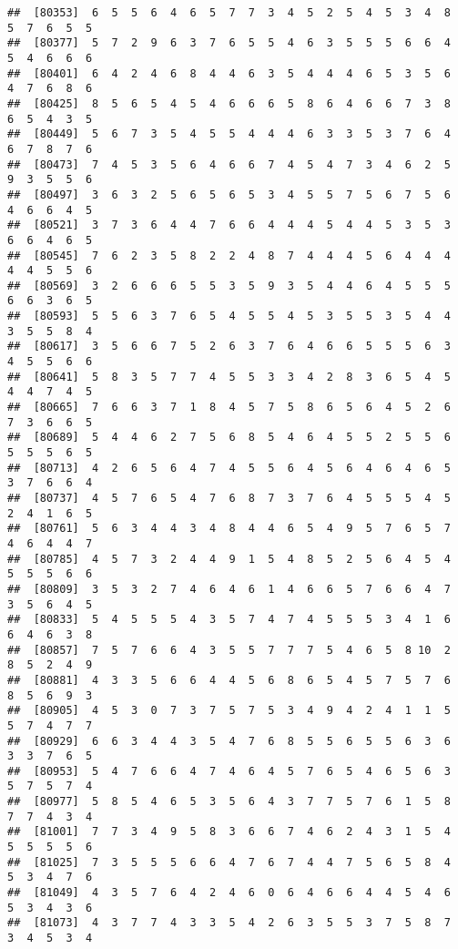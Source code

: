 \documentclass[
]{book}
\begin{document}
\begin{verbatim}
##  [80353]  6  5  5  6  4  6  5  7  7  3  4  5  2  5  4  5  3  4  8  5  7  6  5  5
##  [80377]  5  7  2  9  6  3  7  6  5  5  4  6  3  5  5  5  6  6  4  5  4  6  6  6
##  [80401]  6  4  2  4  6  8  4  4  6  3  5  4  4  4  6  5  3  5  6  4  7  6  8  6
##  [80425]  8  5  6  5  4  5  4  6  6  6  5  8  6  4  6  6  7  3  8  6  5  4  3  5
##  [80449]  5  6  7  3  5  4  5  5  4  4  4  6  3  3  5  3  7  6  4  6  7  8  7  6
##  [80473]  7  4  5  3  5  6  4  6  6  7  4  5  4  7  3  4  6  2  5  9  3  5  5  6
##  [80497]  3  6  3  2  5  6  5  6  5  3  4  5  5  7  5  6  7  5  6  4  6  6  4  5
##  [80521]  3  7  3  6  4  4  7  6  6  4  4  4  5  4  4  5  3  5  3  6  6  4  6  5
##  [80545]  7  6  2  3  5  8  2  2  4  8  7  4  4  4  5  6  4  4  4  4  4  5  5  6
##  [80569]  3  2  6  6  6  5  5  3  5  9  3  5  4  4  6  4  5  5  5  6  6  3  6  5
##  [80593]  5  5  6  3  7  6  5  4  5  5  4  5  3  5  5  3  5  4  4  3  5  5  8  4
##  [80617]  3  5  6  6  7  5  2  6  3  7  6  4  6  6  5  5  5  6  3  4  5  5  6  6
##  [80641]  5  8  3  5  7  7  4  5  5  3  3  4  2  8  3  6  5  4  5  4  4  7  4  5
##  [80665]  7  6  6  3  7  1  8  4  5  7  5  8  6  5  6  4  5  2  6  7  3  6  6  5
##  [80689]  5  4  4  6  2  7  5  6  8  5  4  6  4  5  5  2  5  5  6  5  5  5  6  5
##  [80713]  4  2  6  5  6  4  7  4  5  5  6  4  5  6  4  6  4  6  5  3  7  6  6  4
##  [80737]  4  5  7  6  5  4  7  6  8  7  3  7  6  4  5  5  5  4  5  2  4  1  6  5
##  [80761]  5  6  3  4  4  3  4  8  4  4  6  5  4  9  5  7  6  5  7  4  6  4  4  7
##  [80785]  4  5  7  3  2  4  4  9  1  5  4  8  5  2  5  6  4  5  4  5  5  5  6  6
##  [80809]  3  5  3  2  7  4  6  4  6  1  4  6  6  5  7  6  6  4  7  3  5  6  4  5
##  [80833]  5  4  5  5  5  4  3  5  7  4  7  4  5  5  5  3  4  1  6  6  4  6  3  8
##  [80857]  7  5  7  6  6  4  3  5  5  7  7  7  5  4  6  5  8 10  2  8  5  2  4  9
##  [80881]  4  3  3  5  6  6  4  4  5  6  8  6  5  4  5  7  5  7  6  8  5  6  9  3
##  [80905]  4  5  3  0  7  3  7  5  7  5  3  4  9  4  2  4  1  1  5  5  7  4  7  7
##  [80929]  6  6  3  4  4  3  5  4  7  6  8  5  5  6  5  5  6  3  6  3  3  7  6  5
##  [80953]  5  4  7  6  6  4  7  4  6  4  5  7  6  5  4  6  5  6  3  5  7  5  7  4
##  [80977]  5  8  5  4  6  5  3  5  6  4  3  7  7  5  7  6  1  5  8  7  7  4  3  4
##  [81001]  7  7  3  4  9  5  8  3  6  6  7  4  6  2  4  3  1  5  4  5  5  5  5  6
##  [81025]  7  3  5  5  5  6  6  4  7  6  7  4  4  7  5  6  5  8  4  5  3  4  7  6
##  [81049]  4  3  5  7  6  4  2  4  6  0  6  4  6  6  4  4  5  4  6  5  3  4  3  6
##  [81073]  4  3  7  7  4  3  3  5  4  2  6  3  5  5  3  7  5  8  7  3  4  5  3  4

\end{verbatim}
\end{document}
